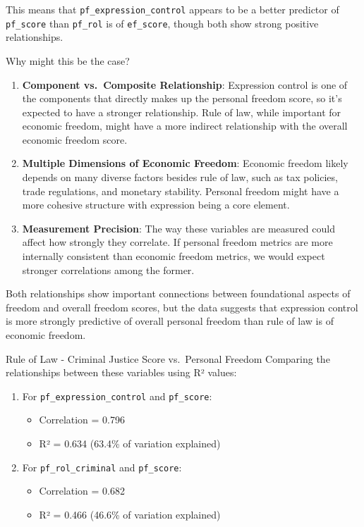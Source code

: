 \documentclass[
]{article}
\providecommand{\tightlist}{%
  \setlength{\itemsep}{0pt}\setlength{\parskip}{0pt}}
\begin{document}
This means that \texttt{pf\_expression\_control} appears to be a better
predictor of \texttt{pf\_score} than \texttt{pf\_rol} is of
\texttt{ef\_score}, though both show strong positive relationships.

Why might this be the case?

\begin{enumerate}
\def\labelenumi{\arabic{enumi}.}
\item
  \textbf{Component vs.~Composite Relationship}: Expression control is
  one of the components that directly makes up the personal freedom
  score, so it's expected to have a stronger relationship. Rule of law,
  while important for economic freedom, might have a more indirect
  relationship with the overall economic freedom score.
\item
  \textbf{Multiple Dimensions of Economic Freedom}: Economic freedom
  likely depends on many diverse factors besides rule of law, such as
  tax policies, trade regulations, and monetary stability. Personal
  freedom might have a more cohesive structure with expression being a
  core element.
\item
  \textbf{Measurement Precision}: The way these variables are measured
  could affect how strongly they correlate. If personal freedom metrics
  are more internally consistent than economic freedom metrics, we would
  expect stronger correlations among the former.
\end{enumerate}

Both relationships show important connections between foundational
aspects of freedom and overall freedom scores, but the data suggests
that expression control is more strongly predictive of overall personal
freedom than rule of law is of economic freedom.

Rule of Law - Criminal Justice Score vs.~Personal Freedom Comparing the
relationships between these variables using R² values:

\begin{enumerate}
\def\labelenumi{\arabic{enumi}.}
\tightlist
\item
  For \texttt{pf\_expression\_control} and \texttt{pf\_score}:

  \begin{itemize}
  \tightlist
  \item
    Correlation = 0.796
  \item
    R² = 0.634 (63.4\% of variation explained)
  \end{itemize}
\item
  For \texttt{pf\_rol\_criminal} and \texttt{pf\_score}:

  \begin{itemize}
  \tightlist
  \item
    Correlation = 0.682
  \item
    R² = 0.466 (46.6\% of variation explained)
  \end{itemize}
\end{enumerate}
\end{document}
